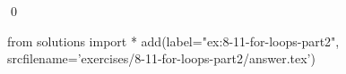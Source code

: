 
\begin{ex}
  \label{ex:8-11-for-loops-part2}
  
  \qed
\end{ex}
\begin{python0}
from solutions import *
add(label="ex:8-11-for-loops-part2",
    srcfilename='exercises/8-11-for-loops-part2/answer.tex')
\end{python0}
